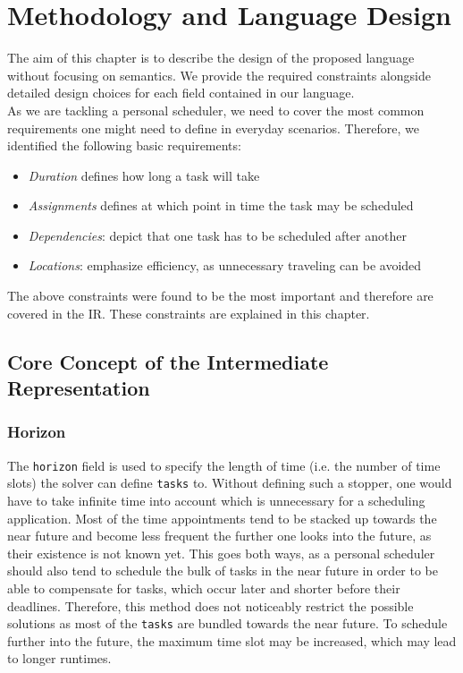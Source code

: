 \cleardoubleoddpage%

\chapter{Methodology and Language Design}
\label{chapter:methodology-language-design}

The aim of this chapter is to describe the design of the proposed language without focusing on semantics. We provide the required constraints alongside detailed design choices for each field contained in our language. \\
As we are tackling a personal scheduler, we need to cover the most common requirements one might need to define in everyday scenarios. Therefore, we identified the following basic requirements:
\begin{itemize}
    \item \emph{Duration} defines how long a task will take
    \item \emph{Assignments} defines at which point in time the task may be scheduled
    \item \emph{Dependencies}: depict that one task has to be scheduled after another
    \item \emph{Locations}: emphasize efficiency, as unnecessary traveling can be avoided
\end{itemize}
The above constraints were found to be the most important and therefore are covered in the \Ac{IR}. These constraints are explained in this chapter.

\section{Core Concept of the Intermediate Representation}
\label{sec:methodology-language-design:language-specification}
\subsection*{Horizon}
The \texttt{horizon} field is used to specify the length of time (i.e. the number of time slots) the solver can define \texttt{tasks} to. Without defining such a stopper, one would have to take infinite time into account which is unnecessary for a scheduling application. Most of the time appointments tend to be stacked up towards the near future and become less frequent the further one looks into the future, as their existence is not known yet. This goes both ways, as a personal scheduler should also tend to schedule the bulk of tasks in the near future in order to be able to compensate for tasks, which occur later and shorter before their deadlines. Therefore, this method does not noticeably restrict the possible solutions as most of the \texttt{tasks} are bundled towards the near future. To schedule further into the future, the maximum time slot may be increased, which may lead to longer runtimes.

